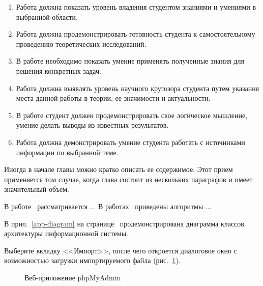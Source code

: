 \documentclass[14pt]{extarticle} %
\begin{document}
\begin{enumerate}
\item Работа должна показать уровень владения студентом 
знаниями и умениями в выбранной области.

\item Работа должна продемонстрировать готовность студента к самостоятельному
проведению теоретических исследований.

\item В работе необходимо показать умение применять полученные знания для решения
конкретных задач.

\item Работа должна выявлять уровень научного кругозора студента путем указания
места данной работы в теории, ее значимости и актуальности.

\item В работе студент должен продемонстрировать свое логическое мышление, умение
делать выводы из известных результатов.

\item Работа должна демонстрировать умение студента работать с источниками информации
по выбранной теме.
\end{enumerate}

Иногда в начале главы можно кратко описать ее содержимое. Этот прием применяется том случае, когда глава состоит из нескольких параграфов и имеет значительный объем.
 

В работе~\cite{Kotel04} рассматривается ... В работах~\cite{cher, W3Schools:mediatypes, W3Schools:html} приведены алгоритмы ...

В прил.~\ref{app-diagram} на странице~\pageref{app-diagram} продемонстрирована диаграмма классов архитектуры информационной системы. 

Выберите вкладку <<Импорт>>, после чего откроется диалоговое окно с возможностью загрузки импортируемого файла (рис.~\ref{pic_phpmyadmin_import}).

\begin{figure}[h]
\centering
\caption{Веб-приложение phpMyAdmin}
\label{pic_phpmyadmin_import}
\end{figure}
\end{document}
